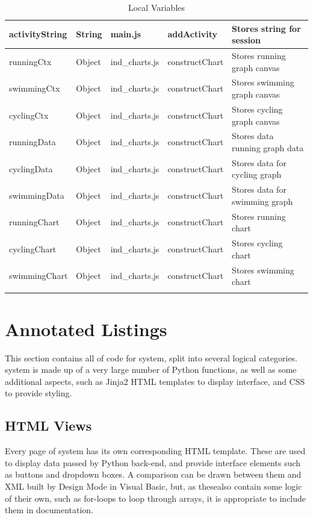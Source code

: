 \documentclass{article}[12pt,a4paper]
\begin{document}
\begin{longtable}{|l|l|l|l|l|}
activityString    & String      & main.js        & addActivity         & Stores string for session           \\ \hline
runningCtx        & Object      & ind\_charts.js & constructChart      & Stores running graph canvas         \\ \hline
swimmingCtx       & Object      & ind\_charts.js & constructChart      & Stores swimming graph canvas        \\ \hline
cyclingCtx        & Object      & ind\_charts.js & constructChart      & Stores cycling graph canvas         \\ \hline
runningData       & Object      & ind\_charts.js & constructChart      & Stores data running graph data      \\ \hline
cyclingData       & Object      & ind\_charts.js & constructChart      & Stores data for cycling graph       \\ \hline
swimmingData      & Object      & ind\_charts.js & constructChart      & Stores data for swimming graph      \\ \hline
runningChart      & Object      & ind\_charts.js & constructChart      & Stores running chart                \\ \hline
cyclingChart      & Object      & ind\_charts.js & constructChart      & Stores cycling chart                \\ \hline
swimmingChart     & Object      & ind\_charts.js & constructChart      & Stores swimming chart               \\ \hline
\caption{Local Variables}
\end{longtable}

\section{Annotated Listings}
This section contains all of code for system, split into several logical categories. system is made up of a very large number of Python functions, as well as some additional aspects, such as Jinja2 HTML templates to display interface, and CSS to provide styling.

\subsection{HTML Views}
Every page of system has its own corresponding HTML template. These are used to display data passed by Python back-end, and provide interface elements such as buttons and dropdown boxes. A comparison can be drawn between them and XML built by Design Mode in Visual Basic, but, as thesealso contain some logic of their own, such as for-loops to loop through arrays, it is appropriate to include them in documentation.
\end{document}
